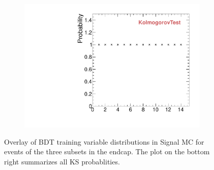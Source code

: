 \begin{figure}
\begin{subfigure}[b]{0.2\textwidth}
                \includegraphics[width=\textwidth]{Figures/VariablesComparison/MC_endcaps_figs_3h/KS}
                \label{fig:MC_endcaps_KS_3h}
        \end{subfigure}
        \caption{Overlay of BDT training variable distributions in Signal MC for events of the three subsets in the endcap. The plot on the bottom right summarizes all KS probablities.}
        \label{fig:MC_endcaps_figs_3h}
\end{figure}


